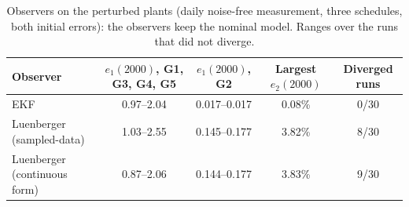 \begin{table}[htbp]
\centering
\caption{Observers on the perturbed plants (daily noise-free measurement, three schedules, both initial errors): the observers keep the nominal model. Ranges over the runs that did not diverge.}
\label{tab:observer_groups}
\small
\begin{tabular}{lcccc}
\toprule
Observer & $e_1(2000)$, G1, G3, G4, G5 & $e_1(2000)$, G2 & Largest $e_2(2000)$ & Diverged runs \\
\midrule
EKF & 0.97--2.04 & 0.017--0.017 & 0.08\% & 0/30 \\
Luenberger (sampled-data) & 1.03--2.55 & 0.145--0.177 & 3.82\% & 8/30 \\
Luenberger (continuous form) & 0.87--2.06 & 0.144--0.177 & 3.83\% & 9/30 \\
\bottomrule
\end{tabular}
\end{table}
